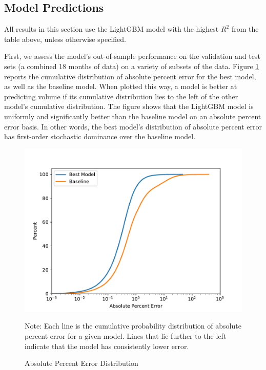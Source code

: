 \documentclass[12pt]{article}
\begin{document}
\subsection{Model Predictions}
All results in this section use the LightGBM model with the highest $R^2$ from the table above, unless otherwise specified.

First, we assess the model's out-of-sample performance on the validation and test sets (a combined 18 months of data) on a variety of subsets of the data. Figure \ref{fig:absolute_percent_error_distribution} reports the cumulative distribution of absolute percent error for the best model, as well as the baseline model. When plotted this way, a model is better at predicting volume if its cumulative distribution lies to the left of the other model's cumulative distribution. The figure shows that the LightGBM model is uniformly and significantly better than the baseline model on an absolute percent error basis. In other words, the best model's distribution of absolute percent error has first-order stochastic dominance over the baseline model.

\begin{figure}[H]
    \centering
    \caption{Absolute Percent Error Distribution}
    \includegraphics[width=0.75\linewidth]{../Output/absolute_percent_error_distribution.pdf}
    \begin{minipage}{0.7\linewidth}
        \footnotesize
        \singlespacing
        Note: Each line is the cumulative probability distribution of absolute percent error for a given model. Lines that lie further to the left indicate that the model has consistently lower error.
    \end{minipage}
    \label{fig:absolute_percent_error_distribution}
\end{figure}
\end{document}
